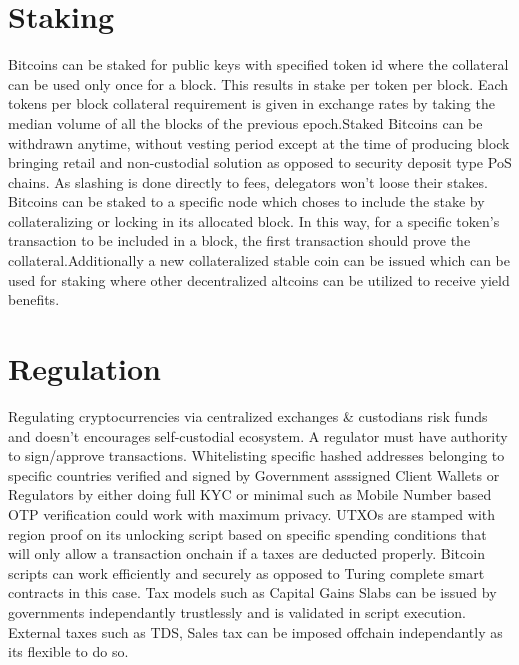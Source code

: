 \documentclass[a4paper,10pt]{article}
\begin{document}
\section{Staking}
Bitcoins can be staked for public keys with specified token id where the collateral can be used only once for a block. This results in stake per token per block. Each tokens per block collateral requirement is given in exchange rates by taking the median volume of all the blocks of the previous epoch.Staked Bitcoins can be withdrawn anytime, without vesting period except at the time of producing block bringing retail and non-custodial solution as opposed to security deposit type PoS chains. As slashing is done directly to fees, delegators won't loose their stakes. Bitcoins can be staked to a specific node which choses to include the stake by collateralizing or locking in its allocated block. In this way, for a specific token's transaction to be included in a block, the first transaction should prove the collateral.Additionally a new collateralized stable coin can be issued which can be used for staking where other decentralized altcoins can be utilized to receive yield benefits. 
\section{Regulation}
Regulating cryptocurrencies via centralized exchanges \& custodians risk funds and doesn't encourages self-custodial ecosystem. A regulator must have authority to sign/approve transactions. Whitelisting specific hashed addresses belonging to specific countries verified and signed by Government asssigned Client Wallets or Regulators by either doing full KYC or minimal such as Mobile Number based OTP verification could work with maximum privacy. UTXOs are stamped with region proof on its unlocking script based on specific spending conditions that will only allow a transaction onchain if a taxes are deducted properly. Bitcoin scripts can work efficiently and securely as opposed to Turing complete smart contracts in this case. Tax models such as Capital Gains Slabs can be issued by governments independantly trustlessly and is validated in script execution. External taxes such as TDS, Sales tax can be imposed offchain independantly as its flexible to do so.
\end{document}
